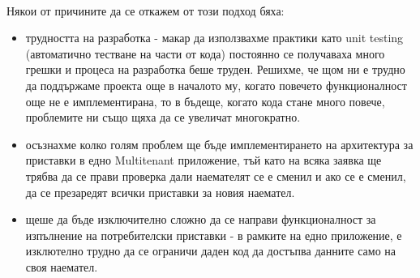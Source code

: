\documentclass[pdftex,14pt,a4paper]{extreport}
\begin{document}
\paragraph {}

Някои от причините да се откажем от този подход бяха:
\begin{itemize}
  \item трудността на разработка - макар да използвахме практики като unit testing (автоматично тестване на части от кода) постоянно се получаваха много грешки и процеса на разработка беше труден. Решихме, че щом ни е трудно да поддържаме проекта още в началото му, когато повечето функционалност още не е имплементирана, то в бъдеще, когато кода стане много повече, проблемите ни също щяха да се увеличат многократно.
  \item осъзнахме колко голям проблем ще бъде имплементирането на архитектура за приставки в едно Multitenant приложение, тъй като на всяка заявка ще трябва да се прави проверка дали наемателят се е сменил и ако се е сменил, да се презаредят всички приставки за новия наемател.
  \item щеше да бъде изключително сложно да се направи функционалност за изпълнение на потребителски приставки - в рамките на едно приложение, е изклютелно трудно да се ограничи даден код да достъпва данните само на своя наемател.
\end{itemize}
\end{document}
